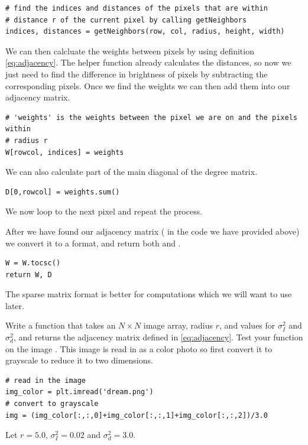 \begin{lstlisting}
# find the indices and distances of the pixels that are within 
# distance r of the current pixel by calling getNeighbors
indices, distances = getNeighbors(row, col, radius, height, width)
\end{lstlisting}
We can then calcluate the weights between pixels by using definition \eqref{eq:adjacency}. The helper function already calculates the distances, so now we just need to find the difference in brightness of pixels by subtracting the corresponding pixels.
Once we find the weights we can then add them into our adjacency matrix. 
\begin{lstlisting}
# 'weights' is the weights between the pixel we are on and the pixels within
# radius r
W[rowcol, indices] = weights
\end{lstlisting}
We can also calculate part of the main diagonal of the degree matrix.
\begin{lstlisting}
D[0,rowcol] = weights.sum()
\end{lstlisting}
We now loop to the next pixel and repeat the process.

After we have found our adjacency matrix ( in the code we have provided above) we convert it to a  format, and return both  and . 
\begin{lstlisting}
W = W.tocsc()
return W, D
\end{lstlisting}
The sparse matrix format  is better for computations which we will want to use later.




\begin{problem}
Write a function  that takes an $N \times N$ image array, radius $r$, and values for
$\sigma_I^2$ and $\sigma_d^2$, and returns the adjacency matrix defined in \eqref{eq:adjacency}. Test your function on the image . This image is read in as a color photo so first convert it to grayscale to reduce it to two dimensions.
\begin{lstlisting}
# read in the image
img_color = plt.imread('dream.png')
# convert to grayscale
img = (img_color[:,:,0]+img_color[:,:,1]+img_color[:,:,2])/3.0
\end{lstlisting}
Let $r=5.0$, $\sigma_I^2=0.02$ and $\sigma_d^2=3.0$.


\label{prob:adjacency_dream}
\end{problem}

